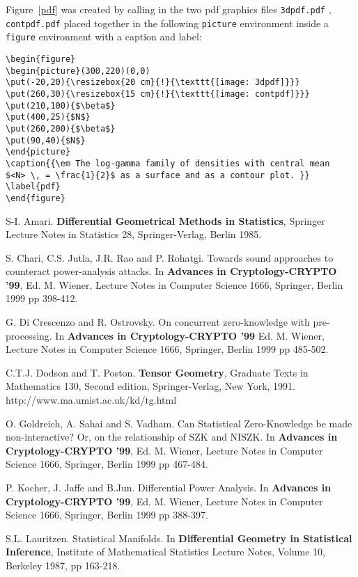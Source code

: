 \documentclass[a4paper,twoside]{article}      %
\begin{document}
Figure~\ref{pdf} was created by calling in the two pdf graphics files
{\tt 3dpdf.pdf} , {\tt contpdf.pdf}
placed together in the following {\tt picture} environment
inside a {\tt figure} environment with a caption and label:
\begin{verbatim}
\begin{figure}
\begin{picture}(300,220)(0,0)
\put(-20,20){\resizebox{20 cm}{!}{\texttt{[image: 3dpdf]}}}
\put(260,30){\resizebox{15 cm}{!}{\texttt{[image: contpdf]}}}
\put(210,100){$\beta$}
\put(400,25){$N$}
\put(260,200){$\beta$}
\put(90,40){$N$}
\end{picture}
\caption{{\em The log-gamma family of densities with central mean
$<N> \, = \frac{1}{2}$ as a surface and as a contour plot. }}
\label{pdf}
\end{figure}
\end{verbatim}






\begin{thebibliography}{99}
 S-I. Amari. {\bf Differential Geometrical Methods in
Statistics}, Springer Lecture Notes in Statistics 28,
Springer-Verlag, Berlin 1985.

 S. Chari, C.S. Jutla, J.R. Rao and P. Rohatgi.
Towards sound approaches to counteract power-analysis attacks. In
{\bf Advances in Cryptology-CRYPTO '99}, Ed. M. Wiener, Lecture
Notes in Computer Science 1666, Springer, Berlin 1999 pp 398-412.

 G. Di Crescenzo and R. Ostrovsky.
On concurrent zero-knowledge with pre-processing. In {\bf Advances
in Cryptology-CRYPTO '99}  Ed. M. Wiener, Lecture Notes in
Computer Science 1666, Springer, Berlin 1999 pp 485-502.

 C.T.J. Dodson and T. Poston. {\bf Tensor Geometry}, Graduate
Texts in Mathematics 130, Second edition, Springer-Verlag, New
York, 1991. 
{http://www.ma.umist.ac.uk/kd/tg.html}


 O. Goldreich, A. Sahai and S. Vadham.
Can Statistical Zero-Knowledge be made non-interactive? Or, on the
relationship of SZK and NISZK. In {\bf Advances in
Cryptology-CRYPTO '99},  Ed. M. Wiener, Lecture Notes in Computer
Science 1666, Springer, Berlin 1999 pp 467-484.

 P. Kocher, J. Jaffe and B.Jun.
Differential Power Analysis. In {\bf Advances in Cryptology-CRYPTO
'99},  Ed. M. Wiener, Lecture Notes in Computer Science 1666,
Springer, Berlin 1999 pp 388-397.

 S.L. Lauritzen. Statistical Manifolds. In {\bf
Differential Geometry in Statistical Inference}, Institute of
Mathematical Statistics Lecture Notes, Volume 10, Berkeley 1987,
pp 163-218.

\end{thebibliography}
\end{document}
